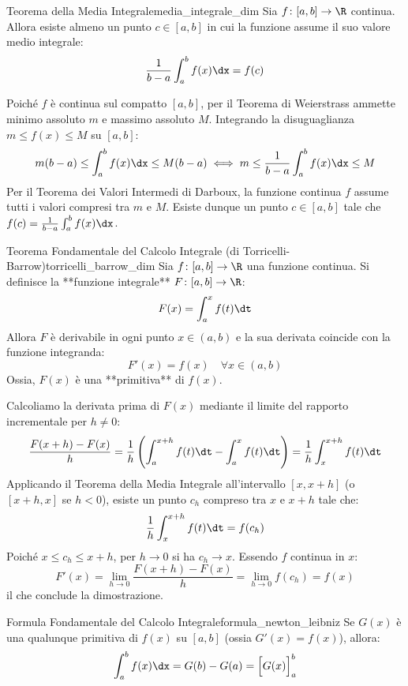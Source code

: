 \begin{teorema}{Teorema della Media Integrale}{media_integrale_dim}
Sia $f \colon [a, b] \to \R$ continua. Allora esiste almeno un punto $c \in [a, b]$ in cui la funzione assume il suo valore medio integrale:
\[
    \frac{1}{b - a} \int_a^b f(x) \dx = f(c)
\]
\end{teorema}

\begin{dimostrazione}
Poiché $f$ è continua sul compatto $[a, b]$, per il Teorema di Weierstrass ammette minimo assoluto $m$ e massimo assoluto $M$.
Integrando la disuguaglianza $m \le f(x) \le M$ su $[a, b]$:
\[
    m(b - a) \le \int_a^b f(x) \dx \le M(b - a) \iff m \le \frac{1}{b - a}\int_a^b f(x)\dx \le M
\]
Per il Teorema dei Valori Intermedi di Darboux, la funzione continua $f$ assume tutti i valori compresi tra $m$ e $M$. Esiste dunque un punto $c \in [a, b]$ tale che $f(c) = \frac{1}{b - a}\int_a^b f(x)\dx$.
\end{dimostrazione}

\begin{teorema}{Teorema Fondamentale del Calcolo Integrale (di Torricelli-Barrow)}{torricelli_barrow_dim}
Sia $f \colon [a, b] \to \R$ una funzione continua. Si definisce la **funzione integrale** $F \colon [a, b] \to \R$:
\[
    F(x) = \int_a^x f(t) \dt
\]
Allora $F$ è derivabile in ogni punto $x \in (a, b)$ e la sua derivata coincide con la funzione integranda:
\[
    F'(x) = f(x) \quad \forall x \in (a, b)
\]
Ossia, $F(x)$ è una **primitiva** di $f(x)$.
\end{teorema}

\begin{dimostrazione}
Calcoliamo la derivata prima di $F(x)$ mediante il limite del rapporto incrementale per $h \neq 0$:
\[
    \frac{F(x + h) - F(x)}{h} = \frac{1}{h} \left( \int_a^{x+h} f(t)\dt - \int_a^x f(t)\dt \right) = \frac{1}{h} \int_x^{x+h} f(t) \dt
\]
Applicando il Teorema della Media Integrale all'intervallo $[x, x+h]$ (o $[x+h, x]$ se $h < 0$), esiste un punto $c_h$ compreso tra $x$ e $x+h$ tale che:
\[
    \frac{1}{h} \int_x^{x+h} f(t) \dt = f(c_h)
\]
Poiché $x \le c_h \le x + h$, per $h \to 0$ si ha $c_h \to x$. Essendo $f$ continua in $x$:
\[
    F'(x) = \lim_{h \to 0} \frac{F(x+h) - F(x)}{h} = \lim_{h \to 0} f(c_h) = f(x)
\]
il che conclude la dimostrazione.
\end{dimostrazione}

\begin{corollario}{Formula Fondamentale del Calcolo Integrale}{formula_newton_leibniz}
Se $G(x)$ è una qualunque primitiva di $f(x)$ su $[a, b]$ (ossia $G'(x) = f(x)$), allora:
\[
    \int_a^b f(x) \dx = G(b) - G(a) = \Big[ G(x) \Big]_a^b
\]
\end{corollario}

